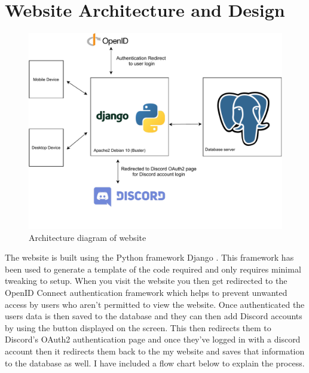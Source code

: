 
\section{Website Architecture and Design}
\begin{figure}[H]
	\centering
	\includegraphics[width=1\linewidth]{Figures/Architecture-website}
	\caption{Architecture diagram of website}
	\label{fig:architecture-web}
\end{figure}

The website is built using the Python framework Django \cite{Django}. This framework has been used to generate a template of the code required and only requires minimal tweaking to setup. When you visit the website you then get redirected to the OpenID Connect \cite{OpenID} authentication framework which helps to prevent unwanted access by users who aren't permitted to view the website. Once authenticated the users data is then saved to the database and they can then add Discord accounts by using the button displayed on the screen. This then redirects them to Discord's OAuth2 authentication page and once they've logged in with a discord account then it redirects them back to the my website and saves that information to the database as well. I have included a flow chart below to explain the process.

